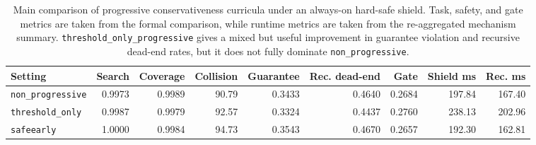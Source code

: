 \begin{table}[t]
\centering
\caption{Main comparison of progressive conservativeness curricula under an always-on hard-safe shield. Task, safety, and gate metrics are taken from the formal comparison, while runtime metrics are taken from the re-aggregated mechanism summary. \texttt{threshold\_only\_progressive} gives a mixed but useful improvement in guarantee violation and recursive dead-end rates, but it does not fully dominate \texttt{non\_progressive}.}
\label{tab:progressive-main}
\small
\begin{tabular}{lrrrrrrrr}
\toprule
Setting & Search & Coverage & Collision & Guarantee & Rec. dead-end & Gate & Shield ms & Rec. ms \\
\midrule
\texttt{non\_progressive} & 0.9973 & 0.9989 & 90.79 & 0.3433 & 0.4640 & 0.2684 & 197.84 & 167.40 \\
\texttt{threshold\_only} & 0.9987 & 0.9979 & 92.57 & 0.3324 & 0.4437 & 0.2760 & 238.13 & 202.96 \\
\texttt{safeearly} & 1.0000 & 0.9984 & 94.73 & 0.3543 & 0.4670 & 0.2657 & 192.30 & 162.81 \\
\bottomrule
\end{tabular}
\end{table}
